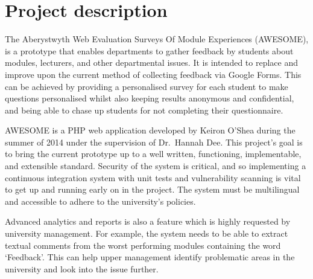 \documentclass[11pt,fleqn,twoside]{article}
\begin{document}
\wordcount{}

\mmp

\setcounter{tocdepth}{3} %


\section{Project description}

The Aberystwyth Web Evaluation Surveys Of Module Experiences (AWESOME), is a prototype that enables departments to gather feedback by students about modules, lecturers, and other departmental issues.
It is intended to replace and improve upon the current method of collecting feedback via Google Forms.
This can be achieved by providing a personalised survey for each student to make questions personalised whilst also keeping results anonymous and confidential, and being able to chase up students for not completing their questionnaire.

AWESOME is a PHP web application developed by Keiron O'Shea during the summer of 2014 under the supervision of Dr.~Hannah Dee.
This project's goal is to bring the current prototype up to a well written, functioning, implementable, and extensible standard.
Security of the system is critical, and so implementing a continuous integration system with unit tests and vulnerability scanning is vital to get up and running early on in the project.
The system must be multilingual and accessible to adhere to the university's policies.

Advanced analytics and reports is also a feature which is highly requested by university management.
For example, the system needs to be able to extract textual comments from the worst performing modules containing the word `Feedback'.
This can help upper management identify problematic areas in the university and look into the issue further.
\end{document}
